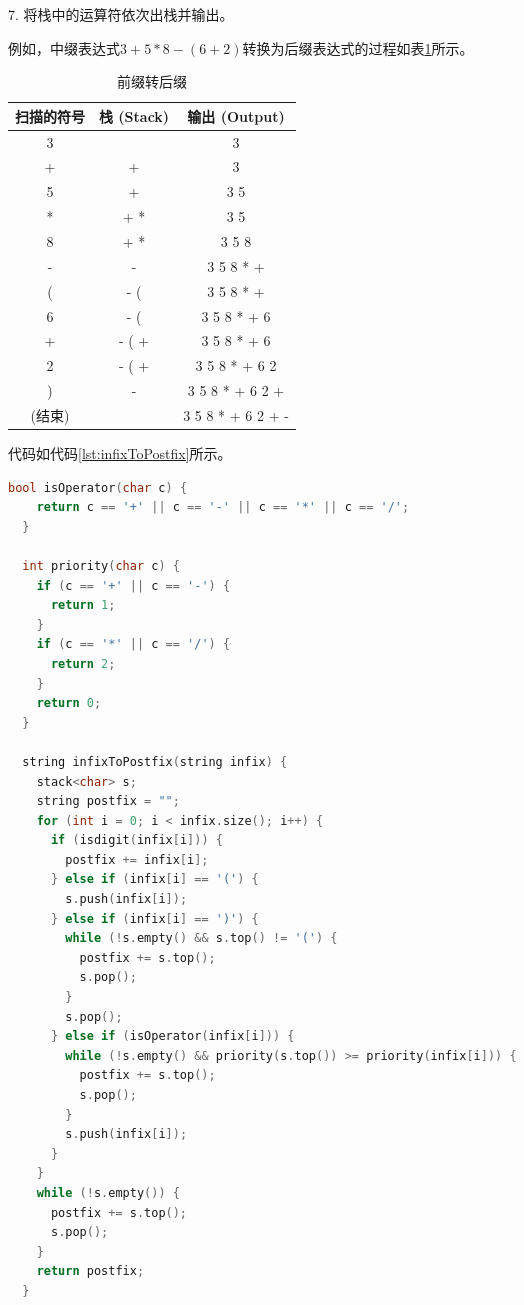 \documentclass[lang=cn,newtx,10pt,scheme=chinese]{elegantbook}
\begin{document}
7. 将栈中的运算符依次出栈并输出。

例如，中缀表达式$3+5*8-(6 + 2)$转换为后缀表达式的过程如表\ref{tab:infixToPostfix}所示。


\begin{table}[h!]
  \centering
  \begin{tabular}{|c|c|c|}
  \hline
  \textbf{扫描的符号} & \textbf{栈 (Stack)} & \textbf{输出 (Output)} \\ \hline
  3 &  & 3 \\ \hline
  + & + & 3 \\ \hline
  5 & + & 3 5 \\ \hline
  * & + * & 3 5 \\ \hline
  8 & + * & 3 5 8 \\ \hline
  - & - & 3 5 8 * + \\ \hline
  ( & - ( & 3 5 8 * + \\ \hline
  6 & - ( & 3 5 8 * + 6 \\ \hline
  + & - ( + & 3 5 8 * + 6 \\ \hline
  2 & - ( + & 3 5 8 * + 6 2 \\ \hline
  ) & - & 3 5 8 * + 6 2 + \\ \hline
  (结束) &  & 3 5 8 * + 6 2 + - \\ \hline
  \end{tabular}
  \caption{前缀转后缀}
  \label{tab:infixToPostfix}
  \end{table}

代码如代码\ref{lst:infixToPostfix}所示。

\begin{lstlisting}[language=C++, caption={中缀表达式转后缀表达式示例代码}, label={lst:infixToPostfix}]
  bool isOperator(char c) {
    return c == '+' || c == '-' || c == '*' || c == '/';
  }

  int priority(char c) {
    if (c == '+' || c == '-') {
      return 1;
    }
    if (c == '*' || c == '/') {
      return 2;
    }
    return 0;
  }

  string infixToPostfix(string infix) {
    stack<char> s;
    string postfix = "";
    for (int i = 0; i < infix.size(); i++) {
      if (isdigit(infix[i])) {
        postfix += infix[i];
      } else if (infix[i] == '(') {
        s.push(infix[i]);
      } else if (infix[i] == ')') {
        while (!s.empty() && s.top() != '(') {
          postfix += s.top();
          s.pop();
        }
        s.pop();
      } else if (isOperator(infix[i])) {
        while (!s.empty() && priority(s.top()) >= priority(infix[i])) {
          postfix += s.top();
          s.pop();
        }
        s.push(infix[i]);
      }
    }
    while (!s.empty()) {
      postfix += s.top();
      s.pop();
    }
    return postfix;
  }

\end{lstlisting}
\end{document}
